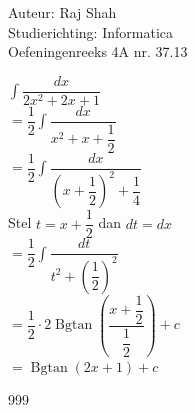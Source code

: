 \documentclass[a4paper]{article}
\begin{document}
  
\noindent \large Auteur: Raj Shah \\
\noindent \large Studierichting: Informatica\\
\noindent \large Oefeningenreeks 4A nr. 37.13\\

\medskip

\normalsize

$\displaystyle\int \dfrac{dx}{2x^2 + 2x +1}$\\

$ = \dfrac{1}{2} \displaystyle\int \dfrac{dx}{x^2 + x + \dfrac{1}{2}}$\\

$ = \dfrac{1}{2} \displaystyle\int \dfrac{dx}{\left(x + \dfrac{1}{2}\right)^2 + \dfrac{1}{4}}$\\

Stel $t = x+\dfrac{1}{2}$ dan $dt = dx$\\

$ = \dfrac{1}{2} \displaystyle\int \dfrac{dt}{t^2 + \left(\dfrac{1}{2}\right)^2}$\\

$ = \dfrac{1}{2} \cdot 2 \operatorname{Bgtan}\left(\dfrac{x+\dfrac{1}{2}}{\dfrac{1}{2}}\right) + c$\\

$ = \operatorname{Bgtan}\left(2x+1\right) + c $\\






\begin{thebibliography}{999}
\end{thebibliography}
\end{document}
